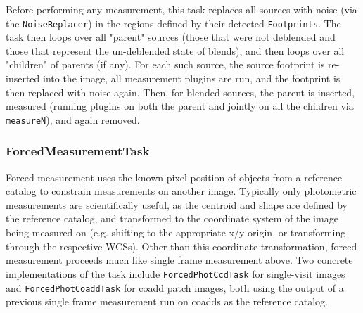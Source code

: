Before performing any measurement, this task replaces all sources with noise (via the \texttt{NoiseReplacer}) in the regions defined by their detected \texttt{Footprints}.
The task then loops over all "parent" sources (those that were not deblended and those that represent the un-deblended state of blends), and then loops over all "children" of parents (if any).
For each such source, the source footprint is re-inserted into the image, all measurement plugins are run, and the footprint is then replaced with noise again.
Then, for blended sources, the parent is inserted, measured (running plugins on both the parent and jointly on all the children via \texttt{measureN}), and again removed.

\subsubsection{ForcedMeasurementTask}
\label{sec:ForcedMeasurementTask}

Forced measurement uses the known pixel position of objects from a reference catalog to constrain measurements on another image.
Typically only photometric measurements are scientifically useful, as the centroid and shape are defined by the reference catalog, and transformed to the coordinate system of the image being measured on (e.g. shifting to the appropriate x/y origin, or transforming through the respective WCSs).
Other than this coordinate transformation, forced measurement proceeds much like single frame measurement above.
Two concrete implementations of the task include \texttt{ForcedPhotCcdTask} for single-visit images and \texttt{ForcedPhotCoaddTask} for coadd patch images, both using the output of a previous single frame measurement run on coadds as the reference catalog.













